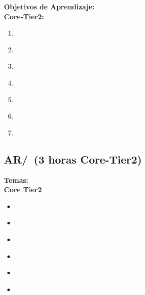 \noindent \textbf{Objetivos de Aprendizaje:}\\
\noindent \textbf{Core-Tier2:}
\begin{enumerate}
	\setcounter{enumi}{0}
	\item \ARDigitallogicanddigitalsystemsLODescribeTheComputer\xspace[\ARDigitallogicanddigitalsystemsLODescribeTheComputerLevel]\label{sec:BOK:ARDigitallogicanddigitalsystemsLODescribeTheComputer}
	\item \ARDigitallogicanddigitalsystemsLOComprehend\xspace[\ARDigitallogicanddigitalsystemsLOComprehendLevel]\label{sec:BOK:ARDigitallogicanddigitalsystemsLOComprehend}
	\item \ARDigitallogicanddigitalsystemsLOExplainTheThe\xspace[\ARDigitallogicanddigitalsystemsLOExplainTheTheLevel]\label{sec:BOK:ARDigitallogicanddigitalsystemsLOExplainTheThe}
	\item \ARDigitallogicanddigitalsystemsLOArticulate\xspace[\ARDigitallogicanddigitalsystemsLOArticulateLevel]\label{sec:BOK:ARDigitallogicanddigitalsystemsLOArticulate}
	\item \ARDigitallogicanddigitalsystemsLODesignThe\xspace[\ARDigitallogicanddigitalsystemsLODesignTheLevel]\label{sec:BOK:ARDigitallogicanddigitalsystemsLODesignThe}
	\item \ARDigitallogicanddigitalsystemsLOUseCad\xspace[\ARDigitallogicanddigitalsystemsLOUseCadLevel]\label{sec:BOK:ARDigitallogicanddigitalsystemsLOUseCad}
	\item \ARDigitallogicanddigitalsystemsLOEvaluate\xspace[\ARDigitallogicanddigitalsystemsLOEvaluateLevel]\label{sec:BOK:ARDigitallogicanddigitalsystemsLOEvaluate}
\end{enumerate}


\subsection{AR/\ARMachinelevelrepresentationofdata~(3 horas Core-Tier2)}\label{sec:BOK:ARMachinelevelrepresentationofdata}
\noindent \textbf{Temas:}\\
\noindent \textbf{Core Tier2}
\begin{itemize}
	\item \ARMachinelevelrepresentationofdataTopicBits\label{sec:BOK:ARMachinelevelrepresentationofdataTopicBits}
	\item \ARMachinelevelrepresentationofdataTopicNumeric\label{sec:BOK:ARMachinelevelrepresentationofdataTopicNumeric}
	\item \ARMachinelevelrepresentationofdataTopicFixed\label{sec:BOK:ARMachinelevelrepresentationofdataTopicFixed}
	\item \ARMachinelevelrepresentationofdataTopicSigned\label{sec:BOK:ARMachinelevelrepresentationofdataTopicSigned}
	\item \ARMachinelevelrepresentationofdataTopicRepresentation\label{sec:BOK:ARMachinelevelrepresentationofdataTopicRepresentation}
	\item \ARMachinelevelrepresentationofdataTopicRepresentationOf\label{sec:BOK:ARMachinelevelrepresentationofdataTopicRepresentationOf}
\end{itemize}


